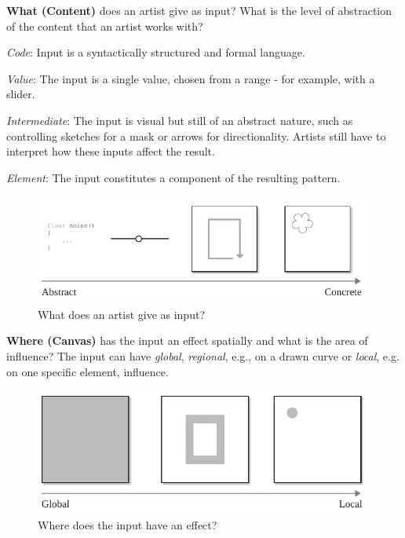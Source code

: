 \noindent\textbf{What (Content)} does an artist give as input? What is the level of abstraction of the content that an artist works with?

\textit{Code}: Input is a syntactically structured and formal language.

\textit{Value}: The input is a single value, chosen from a range - for example, with a slider.

\textit{Intermediate}: The input is visual but still of an abstract nature, such as controlling sketches for a mask or arrows for directionality. Artists still have to interpret how these inputs affect the result.

\textit{Element}: The input constitutes a component of the resulting pattern.

\begin{figure}[H]
    \centering
        \includegraphics[width=\controlParamsFigWidth\linewidth]{figures/control_paradigms/what.pdf}
        \caption{What does an artist give as input?}
\end{figure}

\noindent\textbf{Where (Canvas)} has the input an effect spatially and what is the area of influence? The input can have \textit{global}, \textit{regional}, e.g., on a drawn curve or \textit{local}, e.g. on one specific element,  influence.
\begin{figure}[hbt]
    \centering
        \includegraphics[width=\controlParamsFigWidth\linewidth]{figures/control_paradigms/where.pdf}
        \caption{Where does the input have an effect?}
\end{figure}


